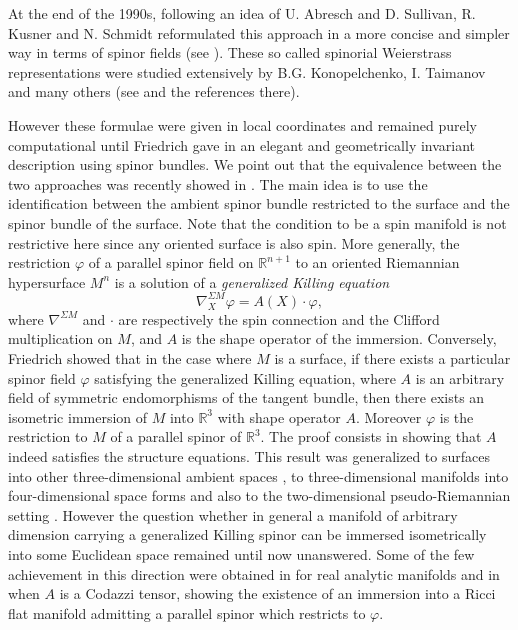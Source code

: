 \documentclass{amsart}
\begin{document}
At the end of the 1990s, following an idea of U. Abresch and D. Sullivan, R. Kusner and N.
Schmidt reformulated this approach in a more concise and simpler way in terms of spinor fields (see \cite{KS}). These so called spinorial Weierstrass representations were studied extensively by B.G. Konopelchenko, I. Taimanov and many others (see \cite{Ko,KL,Ta,Ta2} and the references there).

However these formulae were given in local coordinates and remained purely computational until Friedrich gave in \cite{Fr} an elegant and geometrically invariant description using spinor bundles. We point out that the equivalence between the two approaches was recently showed in \cite{RR}. The main idea is to use the identification between the ambient spinor bundle restricted to the surface and the spinor bundle of the surface.  Note that the condition to be a spin manifold is not restrictive here since any oriented surface is also spin. More generally, the restriction $\varphi$ of a parallel spinor field on $\mathbb{R}^{n+1}$ to an 
oriented Riemannian hypersurface $M^n$ is a solution of a \textit{generalized Killing
equation}
$$\nabla^{\Sigma M}_X\varphi=A(X)\cdot\varphi,$$ 
where  $\nabla^{\Sigma M}$ and $\cdot$ are respectively the  spin connection and the Clifford multiplication on $M$, and $A$ is the shape operator of the immersion. Conversely, Friedrich showed that in the case where $M$ is a surface, if there exists a particular spinor field $\varphi$ satisfying the generalized Killing equation, where $A$ is an arbitrary field of symmetric endomorphisms  of the tangent bundle, then there exists an isometric immersion of $M$ into $\mathbb{R}^3$ with shape operator $A$. Moreover $\varphi$ is the restriction to $M$ of a parallel spinor of $\mathbb{R}^3$. The proof consists in showing that $A$ indeed satisfies the structure equations. This result was generalized to surfaces into other  three-dimensional ambient spaces \cite{Mo,NR,Ro}, to three-dimensional manifolds into four-dimensional space forms \cite{LR1,NR} and also to the two-dimensional pseudo-Riemannian setting \cite{LR2}. However the question whether in general a manifold of arbitrary dimension carrying a generalized Killing spinor can be immersed isometrically into some Euclidean space remained until now unanswered. Some of the few achievement in this direction were obtained in \cite{AMM} for real analytic manifolds and in \cite{BGM,Na} when $A$ is a Codazzi tensor, showing the existence of an immersion into a Ricci flat manifold admitting a parallel spinor which restricts to $\varphi$. 
\end{document}

